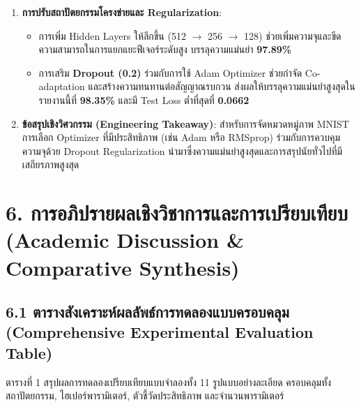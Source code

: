 \documentclass[12pt,a4paper]{article}
\begin{document}
\begin{ansbox}
\begin{enumerate}[leftmargin=18pt, itemsep=3pt]
\begin{itemize}
    \end{itemize}
    \item \textbf{การปรับสถาปัตยกรรมโครงข่ายและ Regularization}:
    \begin{itemize}
        \item การเพิ่ม Hidden Layers ให้ลึกขึ้น (512 $\rightarrow$ 256 $\rightarrow$ 128) ช่วยเพิ่มความจุและขีดความสามารถในการแยกแยะฟีเจอร์ระดับสูง บรรลุความแม่นยำ \textbf{97.89\%}
        \item การเสริม \textbf{Dropout (0.2)} ร่วมกับการใช้ Adam Optimizer ช่วยกำจัด Co-adaptation และสร้างความทนทานต่อสัญญาณรบกวน ส่งผลให้บรรลุความแม่นยำสูงสุดในรายงานนี้ที่ \textbf{98.35\%} และมี Test Loss ต่ำที่สุดที่ \textbf{0.0662}
    \end{itemize}
    \item \textbf{ข้อสรุปเชิงวิศวกรรม (Engineering Takeaway)}:
    สำหรับการจัดหมวดหมู่ภาพ MNIST การเลือก Optimizer ที่มีประสิทธิภาพ (เช่น Adam หรือ RMSprop) ร่วมกับการควบคุมความจุด้วย Dropout Regularization นำมาซึ่งความแม่นยำสูงสุดและการสรุปนัยทั่วไปที่มีเสถียรภาพสูงสุด
\end{enumerate}
\end{ansbox}

\clearpage
\section*{6. การอภิปรายผลเชิงวิชาการและการเปรียบเทียบ\\ \large(Academic Discussion \& Comparative Synthesis)}

\subsection*{6.1 ตารางสังเคราะห์ผลลัพธ์การทดลองแบบครอบคลุม\\ \normalsize(Comprehensive Experimental Evaluation Table)}
ตารางที่ 1 สรุปผลการทดลองเปรียบเทียบแบบจำลองทั้ง 11 รูปแบบอย่างละเอียด ครอบคลุมทั้งสถาปัตยกรรม, ไฮเปอร์พารามิเตอร์, ตัวชี้วัดประสิทธิภาพ และจำนวนพารามิเตอร์
\end{document}
